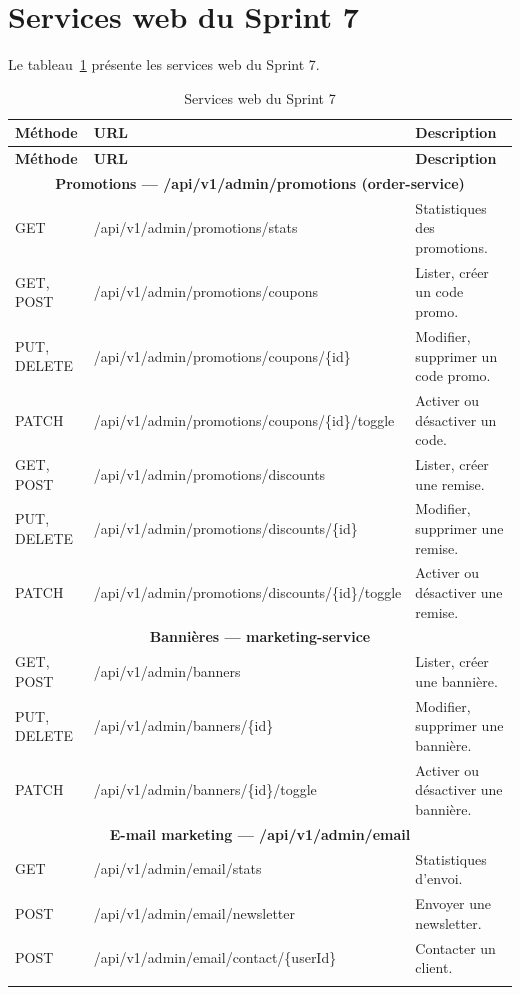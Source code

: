 \section{Services web du Sprint 7}
Le tableau~\ref{tab:ws-sprint7} présente les services web du Sprint 7.
\renewcommand{\arraystretch}{1.15}
\setlength{\tabcolsep}{4pt}
\begin{longtable}{|p{3cm}|p{9cm}|p{3.2cm}|}
\hline
\textbf{Méthode} & \textbf{URL} & \textbf{Description} \\
\hline
\endfirsthead
\hline
\textbf{Méthode} & \textbf{URL} & \textbf{Description} \\
\hline
\endhead
\multicolumn{3}{|c|}{\textbf{Promotions --- /api/v1/admin/promotions (order-service)}} \\
\hline
GET & /api/v1/admin/promotions/stats & Statistiques des promotions. \\
\hline
GET, POST & /api/v1/admin/promotions/coupons & Lister, créer un code promo. \\
\hline
PUT, DELETE & /api/v1/admin/promotions/coupons/\{id\} & Modifier, supprimer un code promo. \\
\hline
PATCH & /api/v1/admin/promotions/coupons/\{id\}/toggle & Activer ou désactiver un code. \\
\hline
GET, POST & /api/v1/admin/promotions/discounts & Lister, créer une remise. \\
\hline
PUT, DELETE & /api/v1/admin/promotions/discounts/\{id\} & Modifier, supprimer une remise. \\
\hline
PATCH & /api/v1/admin/promotions/discounts/\{id\}/toggle & Activer ou désactiver une remise. \\
\hline
\multicolumn{3}{|c|}{\textbf{Bannières --- marketing-service}} \\
\hline
GET, POST & /api/v1/admin/banners & Lister, créer une bannière. \\
\hline
PUT, DELETE & /api/v1/admin/banners/\{id\} & Modifier, supprimer une bannière. \\
\hline
PATCH & /api/v1/admin/banners/\{id\}/toggle & Activer ou désactiver une bannière. \\

\hline
\multicolumn{3}{|c|}{\textbf{E-mail marketing --- /api/v1/admin/email}} \\
\hline
GET & /api/v1/admin/email/stats & Statistiques d'envoi. \\
\hline
POST & /api/v1/admin/email/newsletter & Envoyer une newsletter. \\
\hline
POST & /api/v1/admin/email/contact/\{userId\} & Contacter un client. \\
\hline
\caption{Services web du Sprint 7}
\label{tab:ws-sprint7}
\end{longtable}

